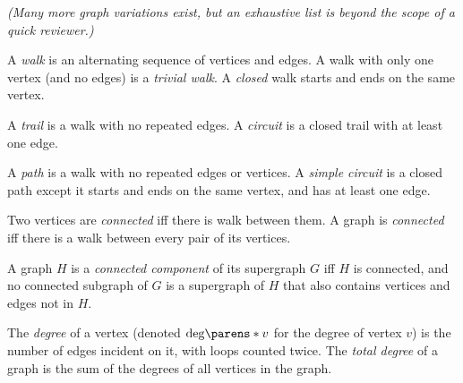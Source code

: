 \begin{figure}[H]
{
        \label{fig:graphs--basic-definitions--list}
    }
    \caption{}%
    \label{fig:graphs--basic-definitions--tree-list-compare}
\end{figure}

\textit{(Many more graph variations exist, but an exhaustive list is beyond the scope of a quick reviewer.)}

A \emph{walk} is an alternating sequence of  vertices and edges. A walk with only one vertex (and no edges) is a \emph{trivial walk}. A \emph{closed} walk starts and ends on the same vertex.

A \emph{trail} is a walk with no repeated edges. A \emph{circuit} is a closed trail with at least one edge.

A \emph{path} is a walk with no repeated edges or vertices. A \emph{simple circuit} is a closed path except it starts and ends on the same vertex, and has at least one edge.





Two vertices are \emph{connected} iff there is walk between them. A graph is \emph{connected} iff there is a walk between every pair of its vertices.

A graph $H$ is a \emph{connected component} of its supergraph $G$ iff $H$ is connected, and no connected subgraph of $G$ is a supergraph of $H$ that also contains vertices and edges not in $H$. 

The \emph{degree} of a vertex (denoted $\mathrm{deg}\parens*{v}$ for the degree of vertex $v$) is the number of edges incident on it, with loops counted twice. The \emph{total degree} of a graph is the sum of the degrees of all vertices in the graph.

